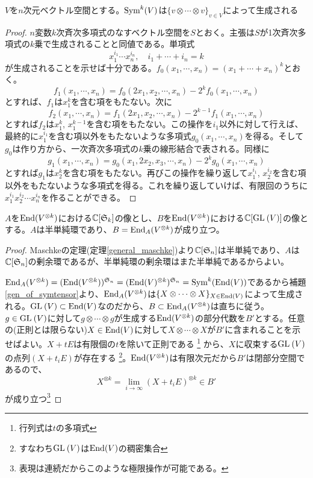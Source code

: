 \documentclass{ltjsreport}
\begin{document}
\begin{lemm}\label{gen_of_symtensor}
  $V$を$n$次元ベクトル空間とする。$\text{Sym}^k(V)$は$\{v\otimes\cdots\otimes v\}_{v\in V}$によって生成される
\end{lemm}

\begin{proof}
  $n$変数$k$次斉次多項式のなすベクトル空間を$S$とおく。主張は$S$が1次斉次多項式の$k$乗で生成されることと同値である。単項式
  \[
  x_1^{i_1}\cdots x_n^{i_n},\quad i_1+\cdots+i_n=k
  \]
  が生成されることを示せば十分である。$f_0(x_1,\cdots,x_n)=(x_1+\cdots +x_n)^k$とおく。
  \[
  f_1(x_1,\cdots,x_n)=f_0(2x_1,x_2,\cdots,x_n)-2^{k}f_0(x_1,\cdots,x_n)  
  \]
  とすれば、$f_1$は$x_1^k$を含む項をもたない。次に
  \[
  f_2(x_1,\cdots,x_n)=f_1(2x_1,x_2,\cdots,x_n)-2^{k-1}f_1(x_1,\cdots,x_n)  
  \]
  とすれば$f_2$は$x_1^{k}$, $x_1^{k-1}$を含む項をもたない。この操作を$i_1$以外に対して行えば、最終的に$x_1^{i_1}$を含む項以外をもたないような多項式$g_0(x_1,\cdots,x_n)$を得る。そして$g_0$は作り方から、一次斉次多項式の$k$乗の線形結合で表される。同様に
  \[
  g_1(x_1,\cdots,x_n)=g_0(x_1,2x_2,x_3,\cdots,x_n)-2^{k}g_0(x_1,\cdots,x_n)  
  \]
  とすれば$g_1$は$x_2^k$を含む項をもたない。再びこの操作を繰り返して$x_1^{i_1}$, $x_2^{i_2}$を含む項以外をもたないような多項式を得る。これを繰り返していけば、有限回のうちに$x_1^{i_1}x_2^{i_2}\cdots x_n^{i_n}$を作ることができる。
\end{proof}


\begin{lemm}\label{lemma}
  $A$を$\text{End}(V^{\otimes k})$における$\mathbb{C}[\mathfrak{S}_k]$の像とし、$B$を$\text{End}(V^{\otimes k})$における$\mathbb{C}[\text{GL}\:(V)]$の像とする。$A$は半単純環であり、$B=\text{End}_A(V^{\otimes k})$が成り立つ。
\end{lemm}

\begin{proof}
  Maschkeの定理(定理\ref{general_maschke})より$\mathbb{C}[\mathfrak{S}_n]$は半単純であり、$A$は$\mathbb{C}[\mathfrak{S}_n]$の剰余環であるが、半単純環の剰余環はまた半単純であるからよい。

  $\text{End}_A(V^{\otimes k})=(\text{End}(V^{\otimes k}))^{\mathfrak{S}_n}=(\text{End}(V)^{\otimes k})^{\mathfrak{S}_n}=\text{Sym}^k(\text{End}(V))$であるから補題\ref{gen_of_symtensor}より、$\text{End}_A(V^{\otimes k})$は$\{X\otimes\cdots\otimes X\}_{X\in\text{End}(V)}$によって生成される。$\text{GL}\:(V)\subset\text{End}(V)$なのだから、$B\subset \text{End}_A(V^{\otimes k})$は直ちに従う。$g\in\text{GL}\:(V)$に対して$g\otimes \cdots\otimes g$が生成する$\text{End}(V^{\otimes k})$の部分代数を$B'$とする。任意の(正則とは限らない)$X\in\text{End}(V)$に対して$X\otimes \cdots\otimes X$が$B'$に含まれることを示せばよい。$X+tE$は有限個の$t$を除いて正則である
  \footnote{
    行列式は$t$の多項式
  }
  から、$X$に収束する$\text{GL}\:(V)$の点列$(X+t_iE)$が存在する
  \footnote{
    すなわち$\text{GL}\:(V)$は$\text{End}(V)$の稠密集合
  }。$\text{End}(V^{\otimes k})$は有限次元だから$B'$は閉部分空間であるので、
  \[
  X^{\otimes k}=\lim_{i\rightarrow\infty}(X+t_iE)^{\otimes k}\in B'  
  \]
  が成り立つ\footnote{
    表現は連続だからこのような極限操作が可能である。
  }
\end{proof}
\end{document}
